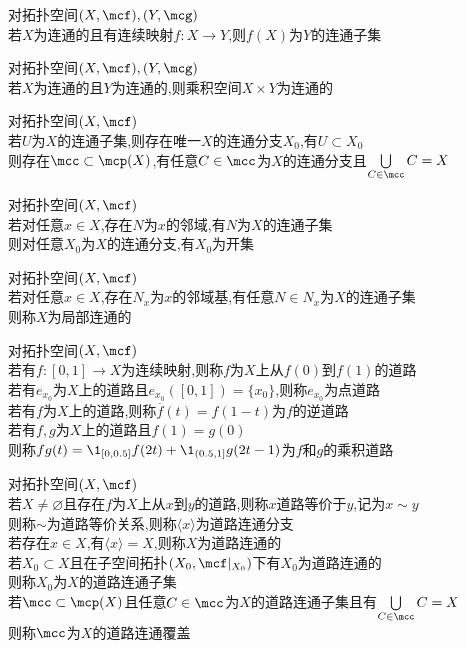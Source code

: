 \begin{dingli}
对拓扑空间$(X,\mcf),(Y,\mcg)$\\
若$X$为连通的且有连续映射$f:X\to Y$,则$f(X)$为$Y$的连通子集
\end{dingli}

\begin{dingli}
对拓扑空间$(X,\mcf),(Y,\mcg)$\\
若$X$为连通的且$Y$为连通的,则乘积空间$X\times Y$为连通的
\end{dingli}

\begin{dingli}
对拓扑空间$(X,\mcf)$\\
若$U$为$X$的连通子集,则存在唯一$X$的连通分支$X_0$,有$U\subset X_0$\\
则存在$\mcc\subset\mcp(X)$,有任意$C\in\mcc$为$X$的连通分支且$\bigcup\limits_{C\in\mcc}C=X$
\end{dingli}

\begin{dingli}
对拓扑空间$(X,\mcf)$\\
若对任意$x\in X$,存在$N$为$x$的邻域,有$N$为$X$的连通子集\\
则对任意$X_0$为$X$的连通分支,有$X_0$为开集
\end{dingli}

\begin{dingyi}
对拓扑空间$(X,\mcf)$\\
若对任意$x\in X$,存在$N_{x}$为$x$的邻域基,有任意$N\in N_{x}$为$X$的连通子集\\
则称$X$为局部连通的
\end{dingyi}

\begin{dingyi}
对拓扑空间$(X,\mcf)$\\
若有$f:[0,1]\to X$为连续映射,则称$f$为$X$上从$f(0)$到$f(1)$的道路\\
若有$e_{x_0}$为$X$上的道路且$e_{x_0}([0,1])=\{x_0\}$,则称$e_{x_0}$为点道路\\
若有$f$为$X$上的道路,则称$\overline{f}(t)=f(1-t)$为$f$的逆道路\\
若有$f,g$为$X$上的道路且$f(1)=g(0)$\\
则称$fg(t)=\1_{[0,0.5]}f(2t)+\1_{(0.5,1]}g(2t-1)$为$f$和$g$的乘积道路
\end{dingyi}

\begin{dingyi}
对拓扑空间$(X,\mcf)$\\
若$X\neq\varnothing$且存在$f$为$X$上从$x$到$y$的道路,则称$x$道路等价于$y$,记为$x\sim y$\\
则称$\sim$为道路等价关系,则称$\langle x\rangle$为道路连通分支\\
若存在$x\in X$,有$\langle x\rangle=X$,则称$X$为道路连通的\\
若$X_0\subset X$且在子空间拓扑$(X_0,\mcf|_{X_0})$下有$X_0$为道路连通的\\
则称$X_0$为$X$的道路连通子集\\
若$\mcc\subset\mcp(X)$且任意$C\in\mcc$为$X$的道路连通子集且有$\bigcup\limits_{C\in\mcc}C=X$\\
则称$\mcc$为$X$的道路连通覆盖
\end{dingyi}

